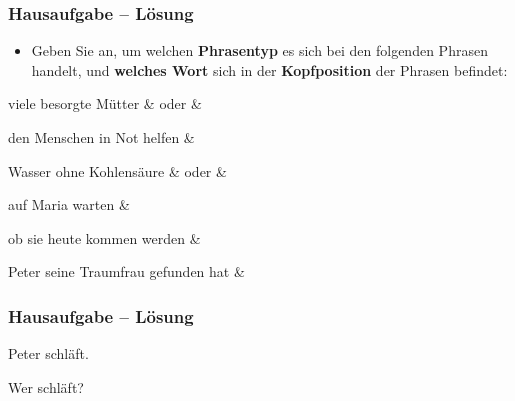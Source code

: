 

\begin{frame}
\frametitle{Hausaufgabe -- Lösung}

\begin{itemize}
	\item Geben Sie an, um welchen \textbf{Phrasentyp} es sich bei den folgenden Phrasen handelt, und \textbf{welches Wort} sich in der \textbf{Kopfposition} der Phrasen befindet:
\end{itemize}	

\eal
	\ex viele besorgte Mütter  \pause \hfill {} \&  oder  \&  \pause 

	\ex den Menschen in Not helfen \pause \hfill {} \&  \pause 
	
	\ex Wasser ohne Kohlensäure \pause \hfill {} \&  oder \alertred{$\emptyset$} \&  \pause 
	
	\ex auf Maria warten \pause \hfill {} \&  \pause 
	
	\ex ob sie heute kommen werden \pause \hfill {} \&  \pause 
	
	\ex Peter seine Traumfrau gefunden hat \pause \hfill {} \& 
\zl

\end{frame}


\begin{frame}
\frametitle{Hausaufgabe -- Lösung}

\begin{minipage}[b]{0.45\textwidth}
	
	{\small Peter schläft.}
	
	\pause
	
	\centering
\end{minipage}  
%            
%         
\begin{minipage}[b]{0.45\textwidth}
	
	\pause 
	
	{\small Wer schläft?}	
	
	\pause 
	
	\centering
\end{minipage}  

\end{frame}


